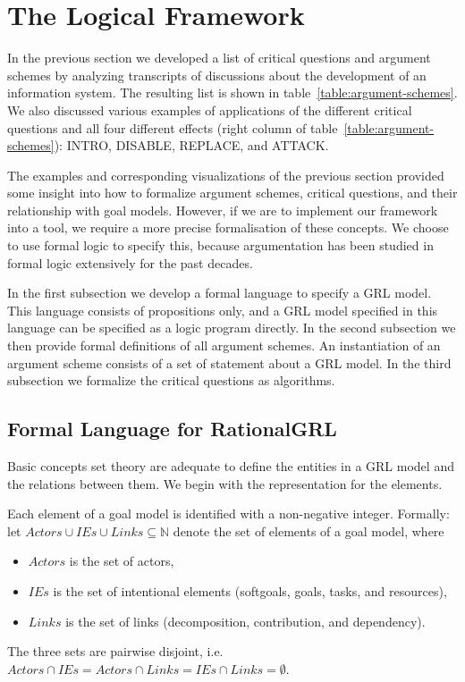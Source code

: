 \section{The Logical Framework}
\label{sect:formalframework}

In the previous section we developed a list of critical questions and argument schemes by analyzing transcripts of discussions about the development of an information system. The resulting list is shown in table~\ref{table:argument-schemes}. We also discussed various examples of applications of the different critical questions and all four different effects (right column of table~\ref{table:argument-schemes}): INTRO, DISABLE, REPLACE, and ATTACK.

The examples and corresponding visualizations of the previous section provided some insight into how to formalize argument schemes, critical questions, and their relationship with goal models. However, if we are to implement our framework into a tool, we require a more precise formalisation of these concepts. We choose to use formal logic to specify this, because argumentation has been studied in formal logic extensively for the past decades.

In the first subsection we develop a formal language to specify a GRL model. This language consists of propositions only, and a GRL model specified in this language can be specified as a logic program directly. In the second subsection we then provide formal definitions of all argument schemes. An instantiation of an argument scheme consists of a set of statement about a GRL model. In the third subsection we formalize the critical questions as algorithms.

\subsection{Formal Language for RationalGRL}

Basic concepts set theory are adequate to define the entities in a GRL model and the relations between them. We begin with the representation for the elements.

\begin{definition}
Each element of a goal model is identified with a non-negative integer. Formally: let $Actors\cup IEs \cup Links \subseteq \mathbb{N}$ denote the set of elements of a goal model, where 
\begin{itemize}
\item $Actors$ is the set of actors, 
\item $IEs$ is the set of intentional elements (softgoals, goals, tasks, and resources),
\item $Links$ is the set of links (decomposition, contribution, and dependency). 
\end{itemize}

The three sets are pairwise disjoint, i.e. $Actors \cap IEs = Actors \cap Links = IEs \cap Links = \emptyset$. 
\end{definition}

